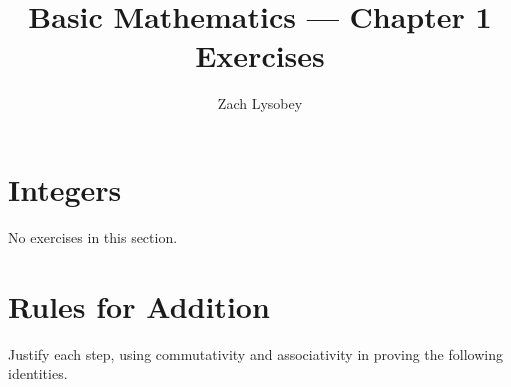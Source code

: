 \documentclass[11pt]{article}
\title{Basic Mathematics --- Chapter 1 Exercises}
\author{Zach Lysobey}
\date{}
\begin{document}
\maketitle

\section{Integers}

No exercises in this section.

\section{Rules for Addition}

Justify each step, using commutativity and associativity in proving the
following identities.
\end{document}
